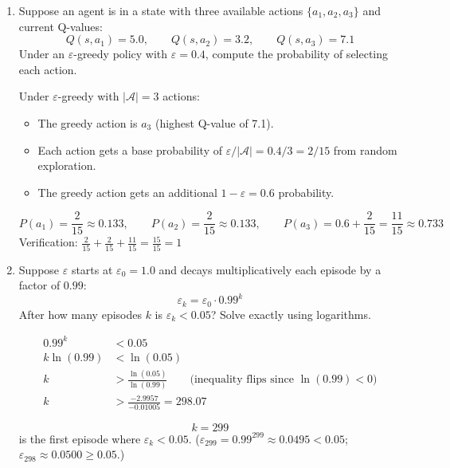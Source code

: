 \documentclass[12pt]{article}
\begin{document}
\begin{enumerate}[label=(\alph*)]
\item Suppose an agent is in a state with three available actions $\{a_1, a_2, a_3\}$ and current Q-values:
\[
Q(s, a_1) = 5.0, \qquad Q(s, a_2) = 3.2, \qquad Q(s, a_3) = 7.1
\]
Under an $\varepsilon$-greedy policy with $\varepsilon = 0.4$, compute the probability of selecting each action.

\begin{stepbox}[Solution 6(a)]
Under $\varepsilon$-greedy with $|\mathcal{A}| = 3$ actions:
\begin{itemize}[nosep]
\item The greedy action is $a_3$ (highest Q-value of 7.1).
\item Each action gets a base probability of $\varepsilon / |\mathcal{A}| = 0.4/3 = 2/15$ from random exploration.
\item The greedy action gets an additional $1 - \varepsilon = 0.6$ probability.
\end{itemize}
\end{stepbox}
\begin{resultsbox}
\[
\boxed{P(a_1) = \frac{2}{15} \approx 0.133}, \qquad
\boxed{P(a_2) = \frac{2}{15} \approx 0.133}, \qquad
\boxed{P(a_3) = 0.6 + \frac{2}{15} = \frac{11}{15} \approx 0.733}
\]
Verification: $\frac{2}{15} + \frac{2}{15} + \frac{11}{15} = \frac{15}{15} = 1$ \checkmark
\end{resultsbox}

\item Suppose $\varepsilon$ starts at $\varepsilon_0 = 1.0$ and decays multiplicatively each episode by a factor of $0.99$:
\[
\varepsilon_k = \varepsilon_0 \cdot 0.99^k
\]
After how many episodes $k$ is $\varepsilon_k < 0.05$? Solve exactly using logarithms.

\begin{stepbox}[Solution 6(b)]
\begin{align*}
0.99^k &< 0.05 \\
k \ln(0.99) &< \ln(0.05) \\
k &> \frac{\ln(0.05)}{\ln(0.99)} \qquad \text{(inequality flips since } \ln(0.99) < 0\text{)} \\
k &> \frac{-2.9957}{-0.01005} = 298.07
\end{align*}
\end{stepbox}
\begin{resultsbox}
\[
\boxed{k = 299}
\]
is the first episode where $\varepsilon_k < 0.05$. ($\varepsilon_{299} = 0.99^{299} \approx 0.0495 < 0.05$; $\varepsilon_{298} \approx 0.0500 \geq 0.05$.)
\end{resultsbox}


\end{enumerate}
\end{document}
